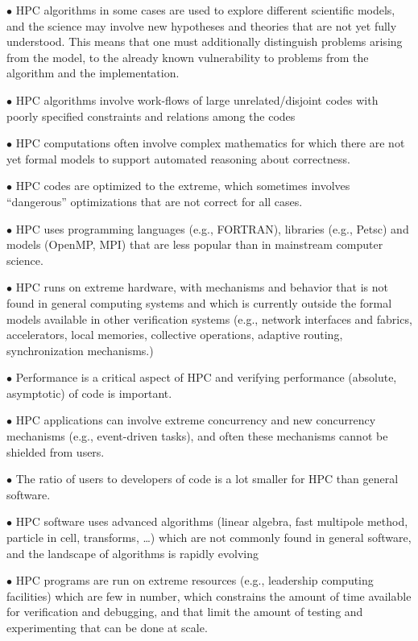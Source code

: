 $\bullet$ HPC algorithms in some cases are used to explore different scientific models, and the science may involve new hypotheses and theories that are not yet fully understood. This means that one must additionally distinguish problems arising from the model, to the already known vulnerability to problems from the algorithm and the implementation. 

$\bullet$ HPC algorithms involve work-flows of large unrelated/disjoint codes with poorly specified constraints and relations among the codes

$\bullet$ HPC computations often involve complex mathematics for which there are not yet formal models to support automated reasoning about correctness.

$\bullet$ HPC codes are optimized to the extreme, which sometimes involves “dangerous” optimizations that are not correct for all cases.

$\bullet$ HPC uses programming languages (e.g., FORTRAN), libraries (e.g., Petsc) and models (OpenMP, MPI) that are less popular than in mainstream computer science.

$\bullet$ HPC runs on extreme hardware, with mechanisms and behavior that is not found in general computing systems and which is currently outside the formal models available in other verification systems (e.g., network interfaces and fabrics, accelerators, local memories, collective operations, adaptive routing, synchronization mechanisms.)

$\bullet$ Performance is a critical aspect of HPC and verifying performance (absolute, asymptotic) of code is important.

$\bullet$ HPC applications can involve extreme concurrency and new concurrency mechanisms (e.g., event-driven tasks), and often these mechanisms cannot be shielded from users.

$\bullet$ The ratio of users to developers of code is a lot smaller for HPC than general software.

$\bullet$ HPC software uses advanced algorithms (linear algebra, fast multipole method, particle in cell, transforms, …) which are not commonly found in general software, and the landscape of algorithms is rapidly evolving

$\bullet$ HPC programs are run on extreme resources (e.g., leadership computing facilities) which are few in number, which constrains the amount of time available for verification and debugging, and that limit the amount of testing and experimenting that can be done at scale.

